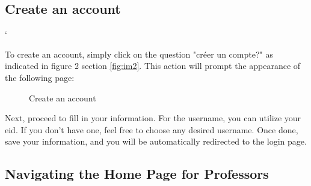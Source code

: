 \documentclass[12pt]{article}
\begin{document}
\newpage
\subsection{Create an account}`\label{cree}

To create an account, simply click on the question "créer un compte?" as indicated in figure 2 section \textcolor{blue}{\ref{fig:im2}}. This action will prompt the appearance of the following page:

\begin{figure}[H]
    \centering
    \caption{Create an account}
\end{figure}

Next, proceed to fill in your information. For the username, you can utilize your eid. If you don't have one, feel free to choose any desired username. Once done, save your information, and you will be automatically redirected to the login page.

\subsection{Navigating the Home Page for Professors}
\end{document}
